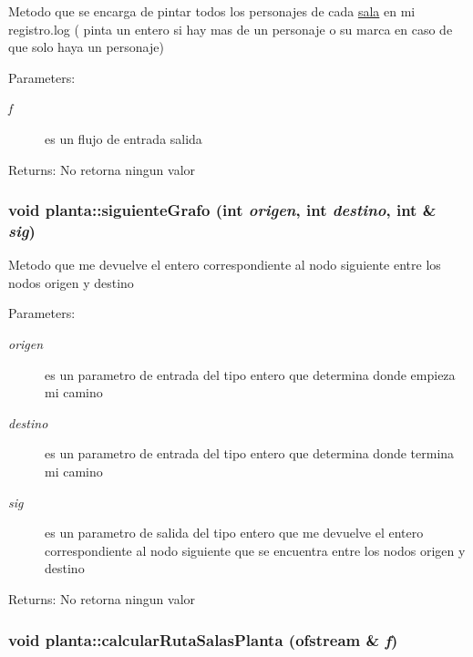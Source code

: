 Metodo que se encarga de pintar todos los personajes de cada \hyperlink{classsala}{sala} en mi registro.log ( pinta un entero si hay mas de un personaje o su marca en caso de que solo haya un personaje) \begin{Desc}
\item[Parameters:]
\begin{description}
\item[{\em f}]es un flujo de entrada salida \end{description}
\end{Desc}
\begin{Desc}
\item[Returns:]No retorna ningun valor \end{Desc}
\hypertarget{classplanta_2e62f6407ca66f91c2ef10647ec5f869}{
\subsubsection[siguienteGrafo]{\setlength{\rightskip}{0pt plus 5cm}void planta::siguienteGrafo (int {\em origen}, \/  int {\em destino}, \/  int \& {\em sig})}}
\label{classplanta_2e62f6407ca66f91c2ef10647ec5f869}


Metodo que me devuelve el entero correspondiente al nodo siguiente entre los nodos origen y destino \begin{Desc}
\item[Parameters:]
\begin{description}
\item[{\em origen}]es un parametro de entrada del tipo entero que determina donde empieza mi camino \item[{\em destino}]es un parametro de entrada del tipo entero que determina donde termina mi camino \item[{\em sig}]es un parametro de salida del tipo entero que me devuelve el entero correspondiente al nodo siguiente que se encuentra entre los nodos origen y destino \end{description}
\end{Desc}
\begin{Desc}
\item[Returns:]No retorna ningun valor \end{Desc}
\hypertarget{classplanta_d11674698b9703b7c570643723ced5fd}{
\subsubsection[calcularRutaSalasPlanta]{\setlength{\rightskip}{0pt plus 5cm}void planta::calcularRutaSalasPlanta (ofstream \& {\em f})}}
\label{classplanta_d11674698b9703b7c570643723ced5fd}


